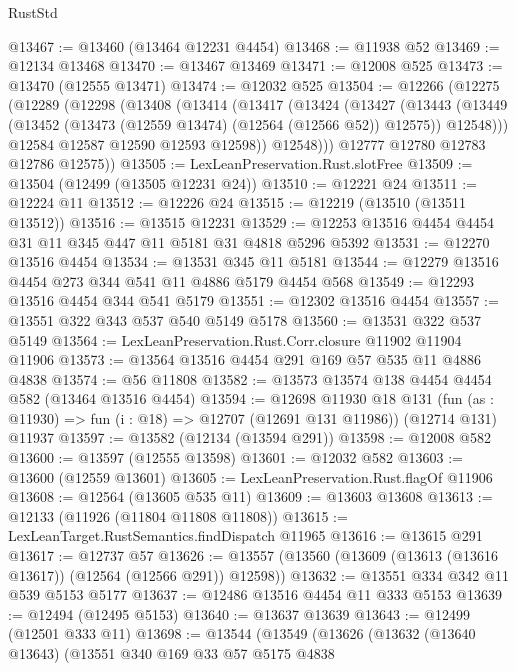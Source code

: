 \begin{lexlean}{RustStd}
\begin{coremodule}
@13467 := @13460 (@13464 @12231 @4454)
@13468 := @11938 @52
@13469 := @12134 @13468
@13470 := @13467 @13469
@13471 := @12008 @525
@13473 := @13470 (@12555 @13471)
@13474 := @12032 @525
@13504 := @12266
    (@12275
      (@12289
        (@12298
          (@13408
            (@13414
              (@13417
                (@13424
                  (@13427
                    (@13443
                      (@13449
                        (@13452 (@13473 (@12559 @13474) (@12564 (@12566 @52)) @12575))
                        @12548)))
                  @12584
                  @12587
                  @12590
                  @12593
                  @12598))
              @12548)))
        @12777
        @12780
        @12783
        @12786
        @12575))
@13505 := LexLeanPreservation.Rust.slotFree
@13509 := @13504 (@12499 (@13505 @12231 @24))
@13510 := @12221 @24
@13511 := @12224 @11
@13512 := @12226 @24
@13515 := @12219 (@13510 (@13511 @13512))
@13516 := @13515 @12231
@13529 := @12253 @13516 @4454 @4454 @31 @11 @345 @447 @11 @5181 @31 @4818 @5296 @5392
@13531 := @12270 @13516 @4454
@13534 := @13531 @345 @11 @5181
@13544 := @12279 @13516 @4454 @273 @344 @541 @11 @4886 @5179 @4454 @568
@13549 := @12293 @13516 @4454 @344 @541 @5179
@13551 := @12302 @13516 @4454
@13557 := @13551 @322 @343 @537 @540 @5149 @5178
@13560 := @13531 @322 @537 @5149
@13564 := LexLeanPreservation.Rust.Corr.closure @11902 @11904 @11906
@13573 := @13564 @13516 @4454 @291 @169 @57 @535 @11 @4886 @4838
@13574 := @56 @11808
@13582 := @13573 @13574 @138 @4454 @4454 @582 (@13464 @13516 @4454)
@13594 := @12698
    @11930
    @18
    @131
    (fun (as : @11930) => fun (i : @18) => @12707 (@12691 @131 @11986))
    (@12714 @131)
    @11937
@13597 := @13582 (@12134 (@13594 @291))
@13598 := @12008 @582
@13600 := @13597 (@12555 @13598)
@13601 := @12032 @582
@13603 := @13600 (@12559 @13601)
@13605 := LexLeanPreservation.Rust.flagOf @11906
@13608 := @12564 (@13605 @535 @11)
@13609 := @13603 @13608
@13613 := @12133 (@11926 (@11804 @11808 @11808))
@13615 := LexLeanTarget.RustSemantics.findDispatch @11965
@13616 := @13615 @291
@13617 := @12737 @57
@13626 := @13557 (@13560 (@13609 (@13613 (@13616 @13617)) (@12564 (@12566 @291)) @12598))
@13632 := @13551 @334 @342 @11 @539 @5153 @5177
@13637 := @12486 @13516 @4454 @11 @333 @5153
@13639 := @12494 (@12495 @5153)
@13640 := @13637 @13639
@13643 := @12499 (@12501 @333 @11)
@13698 := @13544
    (@13549
      (@13626
        (@13632
          (@13640 @13643)
          (@13551
            @340
            @169
            @33
            @57
            @5175
            @4838

\end{coremodule}
\end{lexlean}

